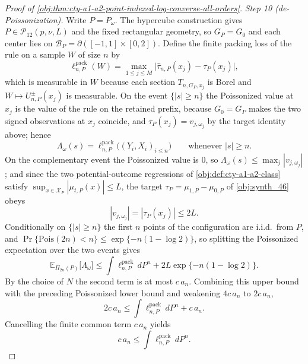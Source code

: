 \begin{proof}[Proof of \cref{obj:thm:cty-a1-a2-point-indexed-log-converse-all-orders}]
\emph{Step 10 (de-Poissonization).}
Write \(P=P_\omega\).  The hypercube construction gives
\(P\in\mathcal P_{12}(p,\nu,L)\) and the fixed rectangular geometry, so
\(G_P=G_0\) and each center lies on
\(\mathcal B_P=\partial([-1,1]\times[0,2])\).  Define the finite packing loss of
the rule on a sample \(W\) of size \(n\) by
\[
\ell^{\mathrm{pack}}_{n,P}(W)
=\max_{1\leq j\leq M}
\bigl|\widehat\tau_{n,P}(x_j)-\tau_P(x_j)\bigr|,
\]
which is measurable in \(W\) because each section \(T_{n,G_P,x_j}\) is Borel and
\(W\mapsto U^{\pm}_{n,P}(x_j)\) is measurable.
On the event \(\{|s|\geq n\}\) the Poissonized value at \(x_j\) is the value of
the rule on the retained prefix, because \(G_0=G_P\) makes the two signed
observations at \(x_j\) coincide, and \(\tau_P(x_j)=v_{j,\omega_j}\) by the
target identity above; hence
\[
\Lambda_\omega(s)=\ell^{\mathrm{pack}}_{n,P}\bigl((Y_i,X_i)_{i\leq n}\bigr)
\qquad\text{whenever }|s|\geq n .
\]
On the complementary event the Poissonized value is \(0\), so
\(\Lambda_\omega(s)\leq\max_j|v_{j,\omega_j}|\); and since the two
potential-outcome regressions of \cref{obj:def:cty-a1-a2-class} satisfy
\(\sup_{x\in\mathcal X_P}|\mu_{t,P}(x)|\leq L\), the target
\(\tau_P=\mu_{1,P}-\mu_{0,P}\) of \cref{obj:synth_46} obeys
\[
|v_{j,\omega_j}|=|\tau_P(x_j)|\leq 2L .
\]
Conditionally on \(\{|s|\geq n\}\) the first \(n\) points of the configuration
are i.i.d.\ from \(P\), and \(\Pr\{\mathrm{Pois}(2n)<n\}\leq\exp\{-n(1-\log2)\}\),
so splitting the Poissonized expectation over the two events gives
\[
\mathbb E_{\Pi_{2n}(P)}\bigl[\Lambda_\omega\bigr]
\leq
\int \ell^{\mathrm{pack}}_{n,P}\,dP^n
+2L\exp\{-n(1-\log 2)\}.
\]
By the choice of \(N\) the second term is at most \(c\,a_n\).  Combining this
upper bound with the preceding Poissonized lower bound and weakening
\(4c\,a_n\) to \(2c\,a_n\),
\[
2c\,a_n\leq \int \ell^{\mathrm{pack}}_{n,P}\,dP^n+c\,a_n.
\]
Cancelling the finite common term \(c\,a_n\) yields
\[
c\,a_n\leq \int \ell^{\mathrm{pack}}_{n,P}\,dP^n .
\]


\end{proof}
